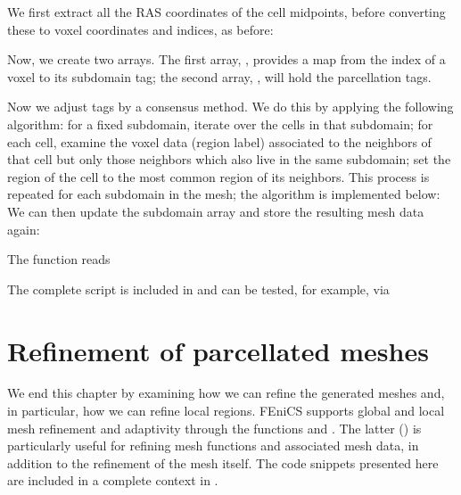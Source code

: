 We first extract all the RAS coordinates of the cell midpoints,
before converting these to voxel coordinates and indices, as before:

Now, we create two arrays. The first array, , provides 
a map from the index of a voxel to its subdomain tag;  the second array, 
, will hold the parcellation tags. 

Now we adjust tags by a consensus method. We do this by applying the following 
algorithm: for a fixed subdomain, iterate over the cells in that subdomain; 
for each cell, examine the voxel data (region label) associated to the neighbors 
of that cell but only those neighbors which also live in the same subdomain; set 
the region of the cell to the most common region of its neighbors. This 
process is repeated for each subdomain in the mesh; the algorithm is 
implemented below: 
We can then update the subdomain array
and store the resulting mesh data again:

The  function reads 

The complete script is included in
 and can be tested, for example, via 

\section{Refinement of parcellated meshes}
\label{sec:chp4:addparcellations}

We end this chapter by examining how we can refine the generated
meshes and, in particular, how we can refine local regions. FEniCS
supports global and local mesh refinement and adaptivity through the
functions  and . The latter
() is particularly useful for refining mesh
functions and associated mesh data, in addition to the refinement of
the mesh itself. The code snippets presented here are included in
a complete context in . 

